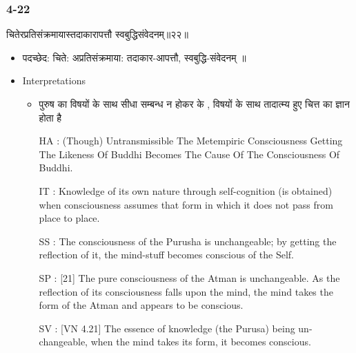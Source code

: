 \begin{frame}[fragile]\frametitle{4-22}
\begin{sanskrit}
चितेरप्रतिसंक्रमायास्तदाकारापत्तौ स्वबुद्धिसंवेदनम्॥२२॥
\end{sanskrit}

	\begin{itemize}
	\item पदच्छेद: चिते: अप्रतिसंक्रमाया:‌ तदाकार-आपत्तौ, स्वबुद्धि-संवेदनम् ॥
	\item Interpretations
		\begin{itemize}	
		\item पुरुष का विषयों के साथ सीधा सम्बन्ध न होकर के , विषयों के साथ तादात्म्य हुए चित्त का ज्ञान होता है
		\item [HA]: (Though) Untransmissible The Metempiric Consciousness Getting The Likeness Of Buddhi Becomes The Cause Of The Consciousness Of Buddhi.
		\item [IT]: Knowledge of its own nature through self-cognition (is obtained) when consciousness assumes that form in which it does not pass from place to place.
		\item [SS]: The consciousness of the Purusha is unchangeable; by getting the reflection of it, the mind-stuff becomes conscious of the Self.
		\item [SP]: [21] The pure consciousness of the Atman is unchangeable. As the reflection of its consciousness falls upon the mind, the mind takes the form of the Atman and appears to be conscious.
		\item [SV]: [VN 4.21] The essence of knowledge (the Purusa) being un-changeable, when the mind takes its form, it becomes conscious.
		\end{itemize}
	\end{itemize}
\end{frame}

